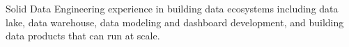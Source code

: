 \documentclass[letterpaper]{deedy-resume} %
\begin{document}

\lastupdated %

\sectionspace
Solid Data Engineering experience in building data ecosystems including data lake, data warehouse, data modeling and dashboard development, and building data products that can run at scale.
\end{document}
